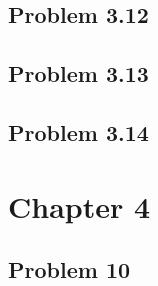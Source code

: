 \documentclass[12pt]{extarticle}
\theoremstyle{definition}
\begin{document}
\subsection{Problem 3.12}

\subsection{Problem 3.13}

\subsection{Problem 3.14}

\section{Chapter 4}

\subsection{Problem 10}
\end{document}
